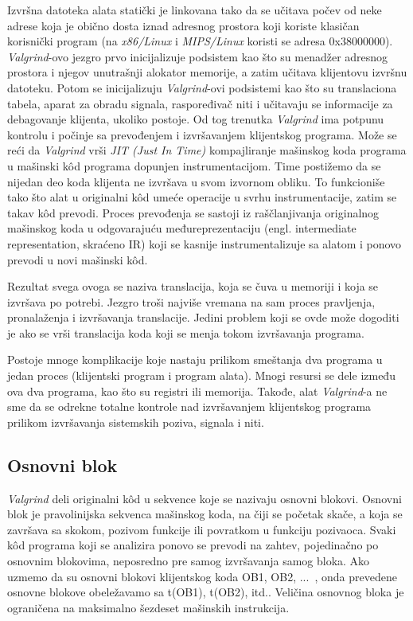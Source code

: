 \documentclass[12pt,oneside]{memoir}
\theoremstyle{plain}
\theoremstyle{definition}
\begin{document}
Izvršna datoteka alata statički je linkovana tako da se učitava počev od neke adrese koja je obično dosta iznad adresnog prostora koji koriste klasičan korisnički program (na \textit{x86/Linux} i \textit{MIPS/Linux} koristi se adresa 0x38000000). \textit{Valgrind}-ovo jezgro prvo inicijalizuje podsistem kao što su menadžer adresnog prostora i njegov unutrašnji alokator memorije, a zatim učitava klijentovu izvršnu datoteku. Potom se inicijalizuju \textit{Valgrind}-ovi podsistemi kao što su translaciona tabela, aparat za obradu signala, raspoređivač niti i učitavaju se informacije za debagovanje klijenta, ukoliko postoje. Od tog trenutka \textit{Valgrind} ima potpunu kontrolu i počinje sa prevođenjem i izvršavanjem klijentskog programa. Može se reći da \textit{Valgrind} vrši \textit{JIT (Just In Time)} kompajliranje mašinskog koda programa u mašinski k\^od programa dopunjen instrumentacijom. Time postižemo da se nijedan deo koda klijenta ne izvršava u svom izvornom obliku. To funkcioniše tako što alat u originalni k\^od umeće operacije u svrhu instrumentacije, zatim se takav k\^od prevodi. Proces prevođenja se sastoji iz raščlanjivanja originalnog mašinskog koda u odgovarajuću međureprezentaciju (engl. intermediate representation, skraćeno IR) koji se kasnije instrumentalizuje sa alatom i ponovo prevodi u novi mašinski k\^od.

Rezultat svega ovoga se naziva translacija, koja se čuva u memoriji i koja se izvršava po potrebi. Jezgro troši najviše vremana na sam proces pravljenja,  pronalaženja i izvršavanja translacije. Jedini problem koji se ovde može dogoditi je ako se vrši translacija koda koji se menja tokom izvršavanja programa.

Postoje mnoge komplikacije koje nastaju prilikom smeštanja dva programa u jedan proces (klijentski program i program alata). Mnogi resursi se dele između ova dva programa, kao što su registri ili memorija. Takođe, alat \textit{Valgrind}-a ne sme da se odrekne totalne kontrole nad izvršavanjem klijentskog programa prilikom izvršavanja sistemskih poziva, signala i niti.

\subsection*{Osnovni blok}
\textit{Valgrind} deli originalni k\^od u sekvence koje se nazivaju osnovni blokovi. Osnovni blok je pravolinijska sekvenca mašinskog koda, na čiji se početak skače, a koja se završava sa skokom, pozivom funkcije ili povratkom u funkciju pozivaoca. Svaki k\^od programa koji se analizira ponovo se prevodi na zahtev, pojedinačno po osnovnim blokovima, neposredno pre samog izvršavanja samog bloka. Ako uzmemo da su osnovni blokovi klijentskog koda OB1, OB2, ...~, onda prevedene osnovne blokove obeležavamo sa t(OB1), t(OB2), itd.. Veličina osnovnog bloka je ograničena na maksimalno šezdeset mašinskih instrukcija.
\end{document}
